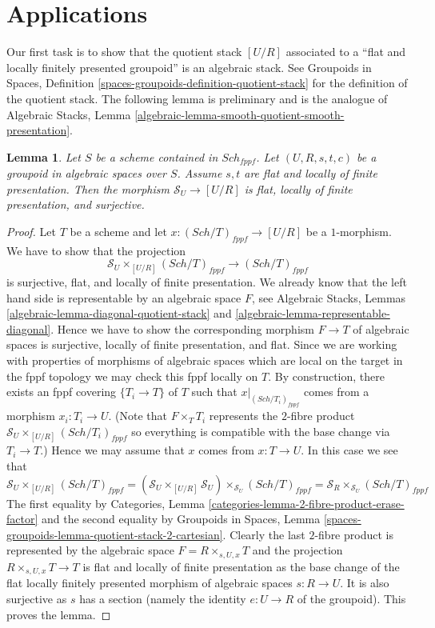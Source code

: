 \documentclass{stacks-project}
\theoremstyle{plain}
\newtheorem{lemma}[subsection]{Lemma}
\theoremstyle{definition}
\theoremstyle{remark}
\numberwithin{equation}{subsection}
\def\Sch{\mathit{Sch}}
\begin{document}
\section{Applications}
\label{section-applications}

\noindent
Our first task is to show that the quotient stack $[U/R]$ associated to
a ``flat and locally finitely presented groupoid'' is an algebraic stack.
See
Groupoids in Spaces,
Definition \ref{spaces-groupoids-definition-quotient-stack}
for the definition of the quotient stack.
The following lemma is preliminary and is the analogue of
Algebraic Stacks,
Lemma \ref{algebraic-lemma-smooth-quotient-smooth-presentation}.

\begin{lemma}
\label{lemma-flat-quotient-flat-presentation}
Let $S$ be a scheme contained in $\Sch_{fppf}$.
Let $(U, R, s, t, c)$ be a groupoid in algebraic spaces over $S$.
Assume $s, t$ are flat and locally of finite presentation.
Then the morphism $\mathcal{S}_U \to [U/R]$ is flat, locally of
finite presentation, and surjective.
\end{lemma}

\begin{proof}
Let $T$ be a scheme and let $x : (\Sch/T)_{fppf} \to [U/R]$
be a $1$-morphism. We have to show that the projection
$$
\mathcal{S}_U \times_{[U/R]} (\Sch/T)_{fppf}
\longrightarrow
(\Sch/T)_{fppf}
$$
is surjective, flat, and locally of finite presentation.
We already know that the left hand side
is representable by an algebraic space $F$, see
Algebraic Stacks, Lemmas \ref{algebraic-lemma-diagonal-quotient-stack} and
\ref{algebraic-lemma-representable-diagonal}.
Hence we have to show the corresponding morphism $F \to T$ of
algebraic spaces is surjective, locally of finite presentation, and flat.
Since we are working with properties of morphisms of algebraic
spaces which are local on the target in the fppf topology we
may check this fppf locally on $T$. By construction, there exists
an fppf covering $\{T_i \to T\}$ of $T$ such that
$x|_{(\Sch/T_i)_{fppf}}$ comes from a morphism
$x_i : T_i \to U$. (Note that $F \times_T T_i$ represents the
$2$-fibre product $\mathcal{S}_U \times_{[U/R]} (\Sch/T_i)_{fppf}$
so everything is compatible with the base change via $T_i \to T$.)
Hence we may assume that $x$ comes from $x : T \to U$.
In this case we see that
$$
\mathcal{S}_U \times_{[U/R]} (\Sch/T)_{fppf}
=
(\mathcal{S}_U \times_{[U/R]} \mathcal{S}_U)
\times_{\mathcal{S}_U} (\Sch/T)_{fppf}
=
\mathcal{S}_R \times_{\mathcal{S}_U} (\Sch/T)_{fppf}
$$
The first equality by
Categories, Lemma \ref{categories-lemma-2-fibre-product-erase-factor}
and the second equality by
Groupoids in Spaces,
Lemma \ref{spaces-groupoids-lemma-quotient-stack-2-cartesian}.
Clearly the last $2$-fibre product is represented by the algebraic
space $F = R \times_{s, U, x} T$ and the projection
$R \times_{s, U, x} T \to T$ is flat and locally of finite presentation
as the base change of the flat locally finitely presented
morphism of algebraic spaces $s : R \to U$.
It is also surjective as $s$ has a section (namely the identity
$e : U \to R$ of the groupoid).
This proves the lemma.
\end{proof}
\end{document}
